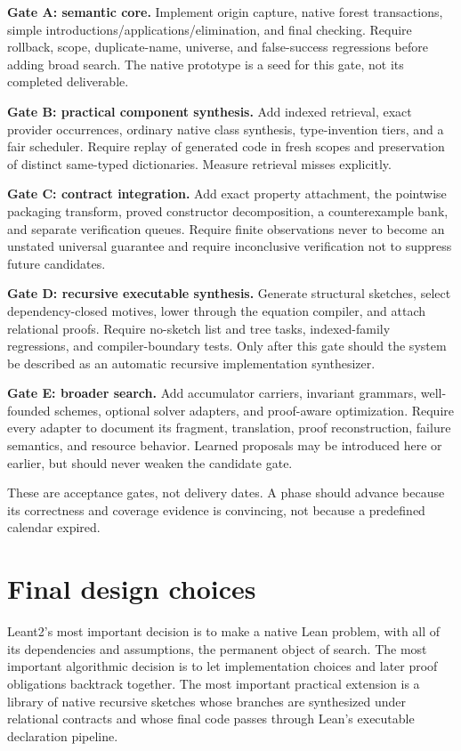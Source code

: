 \textbf{Gate A: semantic core.} Implement origin capture, native forest transactions, simple introductions/applications/elimination, and final checking. Require rollback, scope, duplicate-name, universe, and false-success regressions before adding broad search. The native prototype is a seed for this gate, not its completed deliverable.

\textbf{Gate B: practical component synthesis.} Add indexed retrieval, exact provider occurrences, ordinary native class synthesis, type-invention tiers, and a fair scheduler. Require replay of generated code in fresh scopes and preservation of distinct same-typed dictionaries. Measure retrieval misses explicitly.

\textbf{Gate C: contract integration.} Add exact property attachment, the pointwise packaging transform, proved constructor decomposition, a counterexample bank, and separate verification queues. Require finite observations never to become an unstated universal guarantee and require inconclusive verification not to suppress future candidates.

\textbf{Gate D: recursive executable synthesis.} Generate structural sketches, select dependency-closed motives, lower through the equation compiler, and attach relational proofs. Require no-sketch list and tree tasks, indexed-family regressions, and compiler-boundary tests. Only after this gate should the system be described as an automatic recursive implementation synthesizer.

\textbf{Gate E: broader search.} Add accumulator carriers, invariant grammars, well-founded schemes, optional solver adapters, and proof-aware optimization. Require every adapter to document its fragment, translation, proof reconstruction, failure semantics, and resource behavior. Learned proposals may be introduced here or earlier, but should never weaken the candidate gate.

These are acceptance gates, not delivery dates. A phase should advance because its correctness and coverage evidence is convincing, not because a predefined calendar expired.

\section{Final design choices}

Leant2's most important decision is to make a native Lean problem, with all of its dependencies and assumptions, the permanent object of search. The most important algorithmic decision is to let implementation choices and later proof obligations backtrack together. The most important practical extension is a library of native recursive sketches whose branches are synthesized under relational contracts and whose final code passes through Lean's executable declaration pipeline.

